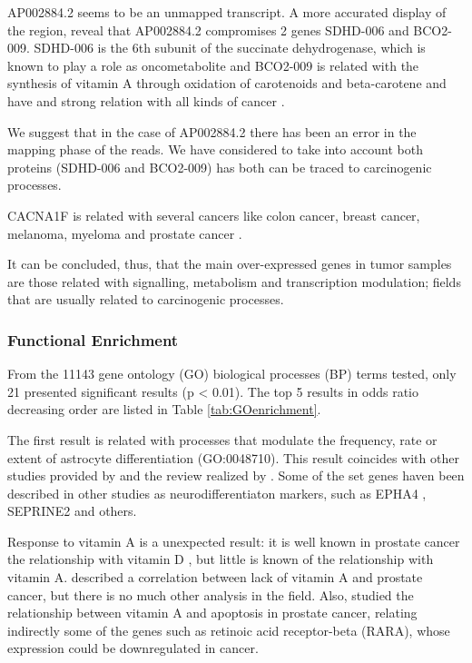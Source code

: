 \documentclass[9pt,twocolumn,twoside]{gsajnl}
\begin{document}
AP002884.2 seems to be an unmapped transcript. A more accurated display of the region, reveal that AP002884.2 compromises 2 genes SDHD-006 and BCO2-009. SDHD-006 is the 6th subunit of the succinate dehydrogenase, which is known to play a role as oncometabolite \cite{oncometabolites} and BCO2-009 is related with the synthesis of vitamin A through oxidation of carotenoids  and beta-carotene and have and strong relation with all kinds of cancer \cite{proteinatlas,uhlen2015tissue}.

We suggest that in the case of AP002884.2 there has been an error in the mapping phase of the reads. We have considered to take into account both proteins (SDHD-006 and BCO2-009) has both can be traced to carcinogenic processes.

CACNA1F is related with several cancers like colon cancer, breast cancer, melanoma, myeloma and prostate cancer \citep{tcng}.


It can be concluded, thus, that the main over-expressed genes in tumor samples are those related with signalling, metabolism and transcription modulation; fields that are usually related to carcinogenic processes.

\subsubsection*{Functional Enrichment}

From the 11143 gene ontology (GO) biological processes (BP) terms tested, only 21 presented significant results (p < 0.01). The top 5 results in odds ratio decreasing order are listed in Table \ref{tab:GOenrichment}.

The first result is related with processes that modulate the frequency, rate or extent of astrocyte differentiation (GO:0048710). This result coincides with other studies provided by \cite{neuroendocrine3, neuroendocrine2} and the review realized by \cite{neuroendocrine1}. Some of the set genes haven been described in other studies as neurodifferentiaton markers, such as EPHA4 \cite{neuroendocrine_EPA}, SEPRINE2 \cite{mckee2013protease} and others.

Response to vitamin A is a unexpected result: it is well known in prostate cancer the relationship with vitamin D \citep{vitamin0,vitamind1,vitamind2,vitamind3}, but little is known of the relationship with vitamin A. \cite{vitamina1} described a correlation between lack of vitamin A and prostate cancer, but there is no much other analysis in the field. Also, \cite{vitamina2} studied the relationship between vitamin A and apoptosis in prostate cancer, relating indirectly some of the genes such as retinoic acid receptor-beta (RARA), whose expression could be downregulated in cancer.
\end{document}
